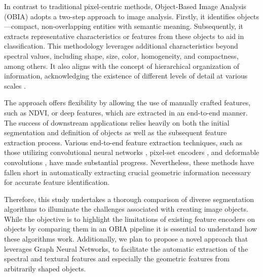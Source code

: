 In contrast to traditional pixel-centric methods, Object-Based Image Analysis (OBIA) adopts a two-step approach to image analysis. Firstly, it identifies objects—compact, non-overlapping entities with semantic meaning. Subsequently, it extracts representative characteristics or features from these objects to aid in classification. This methodology leverages additional characteristics beyond spectral values, including shape, size, color, homogeneity, and compactness, among others. It also aligns with the concept of hierarchical organization of information, acknowledging the existence of different levels of detail at various scales \cite{lang_hierarchical_2003}.

The approach offers flexibility by allowing the use of manually crafted features, such as NDVI, or deep features, which are extracted in an end-to-end manner. The success of downstream applications relies heavily on both the initial segmentation and definition of objects as well as the subsequent feature extraction process. Various end-to-end feature extraction techniques, such as those utilizing convolutional neural networks \cite{audebert_how_2016}, pixel-set encoders \cite{garnot_satellite_2020}, and deformable convolutions \cite{zhao_superpixel_2022}, have made substantial progress. Nevertheless, these methods have fallen short in automatically extracting crucial geometric information necessary for accurate feature identification.

Therefore, this study undertakes a thorough comparison of diverse segmentation algorithms to illuminate the challenges associated with creating image objects. While the objective is to highlight the limitations of existing feature encoders on objects by comparing them in an OBIA pipeline it is essential to understand how these algorithms work. Additionally, we plan to propose a novel approach that leverages Graph Neural Networks, to facilitate the automatic extraction of the spectral and textural features and especially the geometric features from arbitrarily shaped objects.



%